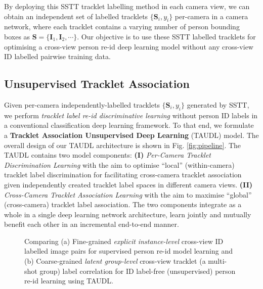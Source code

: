 \documentclass[runningheads]{llncs}
\begin{document}
By deploying this SSTT tracklet labelling method in each camera view, 
we can obtain an independent set of labelled tracklets $\{\bm{S}_i, y_i\}$
per-camera in a camera network,
where each tracklet contains a varying number of 
person bounding boxes as $\bm{S} = \{\bm{I}_1, \bm{I}_2, \cdots \}$. 
Our objective is to use these SSTT labelled tracklets
for optimising a cross-view person re-id deep learning model
without any cross-view ID labelled pairwise training data.



\subsection{Unsupervised Tracklet Association}
\label{sec:tracklet_asso_learning}

Given per-camera independently-labelled tracklets  
$\{\bm{S}_i, y_i\}$ generated by SSTT, 
we perform {\em tracklet label re-id discriminative learning}
without person ID labels in a 
conventional classification deep learning framework.
To that end, we formulate a {\bf Tracklet Association Unsupervised Deep Learning} (TAUDL) model.
The overall design of our TAUDL architecture is shown
in Fig. \ref{fig:pipeline}.
The TAUDL contains two model components:
{\bf(I)} {\em Per-Camera Tracklet Discrimination Learning} 
with the aim to optimise ``local'' (within-camera) tracklet label discrimination
for facilitating cross-camera tracklet association
given independently created tracklet label spaces in different camera views.
{\bf(II)} {\em Cross-Camera Tracklet Association Learning}
with the aim to maximise ``global'' (cross-camera) tracklet label association.
The two components integrate as a whole in a single deep learning 
network architecture, learn jointly and mutually benefit each other
in an incremental end-to-end manner.

\begin{figure} [h]
	\centering
	\caption{Comparing
		(a) Fine-grained {\em explicit instance-level}
          cross-view ID labelled image pairs for supervised person
          re-id model learning and 
		(b) Coarse-grained {\em latent group-level} cross-view
                tracklet (a multi-shot group) label correlation for ID label-free
                (unsupervised) person re-id learning using TAUDL. 
	}
	\label{fig:label_info}
\end{figure}
\end{document}
